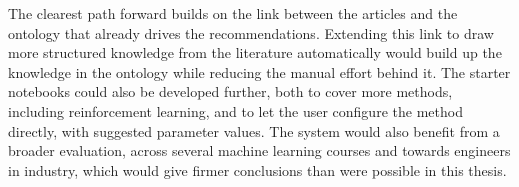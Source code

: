 The clearest path forward builds on the
link between the articles and the ontology that already drives the
recommendations. Extending this link to draw more structured knowledge from the
literature automatically would build up the knowledge in the ontology
while reducing the manual effort behind it.
The starter notebooks could also be developed further, both to cover more
methods, including reinforcement learning, and to let the user configure
the method directly, with suggested parameter values.
The system would also benefit from a broader evaluation, across several
machine learning courses and towards engineers in industry, which would
give firmer conclusions than were possible in this thesis.